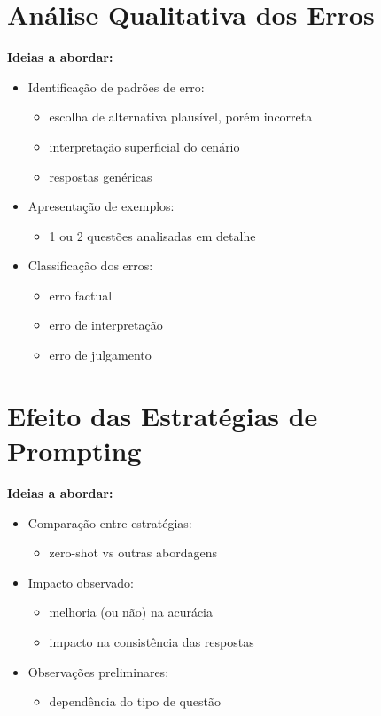 \section{Análise Qualitativa dos Erros}
\label{subsec:analise_erros}

\textbf{Ideias a abordar:}
\begin{itemize}
    \item Identificação de padrões de erro:
    \begin{itemize}
        \item escolha de alternativa plausível, porém incorreta
        \item interpretação superficial do cenário
        \item respostas genéricas
    \end{itemize}
    \item Apresentação de exemplos:
    \begin{itemize}
        \item 1 ou 2 questões analisadas em detalhe
    \end{itemize}
    \item Classificação dos erros:
    \begin{itemize}
        \item erro factual
        \item erro de interpretação
        \item erro de julgamento
    \end{itemize}
\end{itemize}

\section{Efeito das Estratégias de Prompting}
\label{subsec:prompt_resultados}

\textbf{Ideias a abordar:}
\begin{itemize}
    \item Comparação entre estratégias:
    \begin{itemize}
        \item zero-shot vs outras abordagens
    \end{itemize}
    \item Impacto observado:
    \begin{itemize}
        \item melhoria (ou não) na acurácia
        \item impacto na consistência das respostas
    \end{itemize}
    \item Observações preliminares:
    \begin{itemize}
        \item dependência do tipo de questão
    \end{itemize}
\end{itemize}

